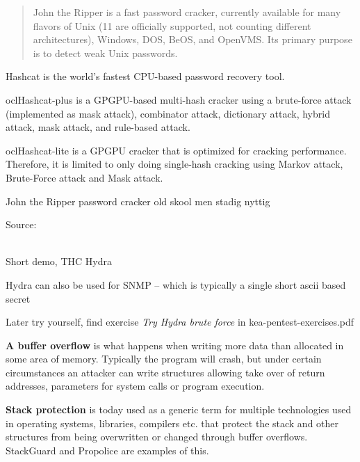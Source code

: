 \documentclass[Screen16to9,17pt]{foils}
\begin{document}


\begin{quote}
John the Ripper is a fast password cracker, currently available for
many flavors of Unix (11 are officially supported, not counting
different architectures), Windows, DOS, BeOS, and OpenVMS. Its primary
purpose is to detect weak Unix passwords.
\end{quote}

\begin{list2}
\item Hashcat is the world's fastest CPU-based password recovery tool.
\item oclHashcat-plus is a GPGPU-based multi-hash cracker using a brute-force attack (implemented as mask attack), combinator attack, dictionary attack, hybrid attack, mask attack, and rule-based attack.
\item oclHashcat-lite is a GPGPU cracker that is optimized for cracking performance. Therefore, it is limited to only doing single-hash cracking using Markov attack, Brute-Force attack and Mask attack.
\item John the Ripper password cracker old skool men stadig nyttig
\end{list2}

Source:\\
\\



\begin{list2}
\item Short demo, THC Hydra
\item Hydra can also be used for SNMP -- which is typically a single short ascii based secret
\item Later try yourself, find exercise \emph{Try Hydra brute force} in kea-pentest-exercises.pdf
\end{list2}




\begin{list1}
\item {\bfseries A buffer overflow} is what happens when writing more data than allocated in some area of memory. Typically the program will crash, but under certain circumstances an attacker can write structures allowing take over of return addresses, parameters for system calls or program execution.
\item {\bfseries Stack protection} is today used as a generic term for multiple technologies used in operating systems, libraries, compilers etc. that protect the stack and other structures from being overwritten or changed through buffer overflows. StackGuard
and Propolice are examples of this.
\end{list1}
\end{document}
